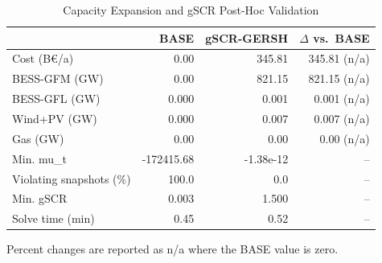 \begin{table}[!t]
\centering
\caption{Capacity Expansion and gSCR Post-Hoc Validation}
\label{tab:results}
\renewcommand{\arraystretch}{1.08}
\begin{tabular}{lrrr}
\toprule
 & BASE & gSCR-GERSH & $\Delta$ vs.\ BASE \\
\midrule
Cost (B€/a) & 0.00 & 345.81 & 345.81 (n/a) \\
BESS-GFM (GW) & 0.00 & 821.15 & 821.15 (n/a) \\
BESS-GFL (GW) & 0.000 & 0.001 & 0.001 (n/a) \\
Wind+PV (GW) & 0.000 & 0.007 & 0.007 (n/a) \\
Gas (GW) & 0.00 & 0.00 & 0.00 (n/a) \\
Min. mu\_t & -172415.68 & -1.38e-12 & -- \\
Violating snapshots (\%) & 100.0 & 0.0 & -- \\
Min. gSCR & 0.003 & 1.500 & -- \\
Solve time (min) & 0.45 & 0.52 & -- \\
\bottomrule
\end{tabular}
\begin{minipage}{0.95\columnwidth}
\footnotesize Percent changes are reported as n/a where the BASE value is zero.
\end{minipage}
\end{table}
